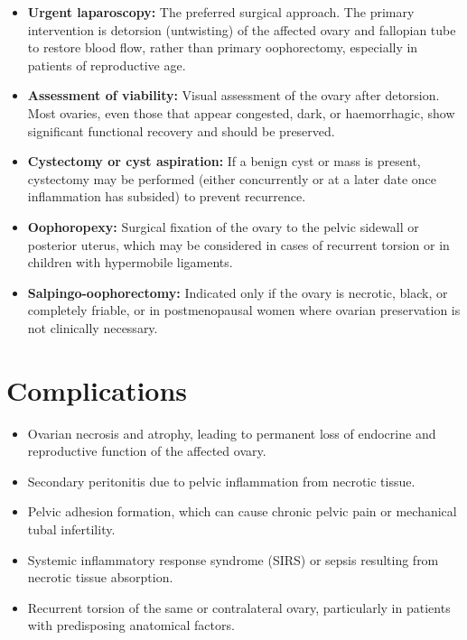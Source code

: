 \begin{itemize}
    \item \textbf{Urgent laparoscopy:} The preferred surgical approach. The primary intervention is detorsion (untwisting) of the affected ovary and fallopian tube to restore blood flow, rather than primary oophorectomy, especially in patients of reproductive age.
    \item \textbf{Assessment of viability:} Visual assessment of the ovary after detorsion. Most ovaries, even those that appear congested, dark, or haemorrhagic, show significant functional recovery and should be preserved.
    \item \textbf{Cystectomy or cyst aspiration:} If a benign cyst or mass is present, cystectomy may be performed (either concurrently or at a later date once inflammation has subsided) to prevent recurrence.
    \item \textbf{Oophoropexy:} Surgical fixation of the ovary to the pelvic sidewall or posterior uterus, which may be considered in cases of recurrent torsion or in children with hypermobile ligaments.
    \item \textbf{Salpingo-oophorectomy:} Indicated only if the ovary is necrotic, black, or completely friable, or in postmenopausal women where ovarian preservation is not clinically necessary.
\end{itemize}

\section*{Complications}
\begin{itemize}
    \item Ovarian necrosis and atrophy, leading to permanent loss of endocrine and reproductive function of the affected ovary.
    \item Secondary peritonitis due to pelvic inflammation from necrotic tissue.
    \item Pelvic adhesion formation, which can cause chronic pelvic pain or mechanical tubal infertility.
    \item Systemic inflammatory response syndrome (SIRS) or sepsis resulting from necrotic tissue absorption.
    \item Recurrent torsion of the same or contralateral ovary, particularly in patients with predisposing anatomical factors.
\end{itemize}

